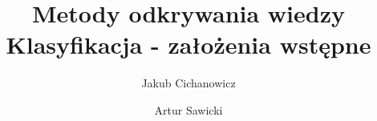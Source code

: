 \documentclass{article}
\begin{document}
\title{Metody odkrywania wiedzy \\%
{\large Klasyfikacja - założenia wstępne} }

\author{Jakub Cichanowicz \and Artur Sawicki}

\maketitle
\end{document}
